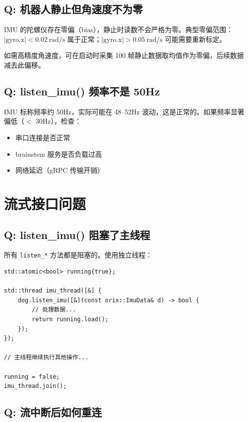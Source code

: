 \documentclass[a4paper,11pt,openany]{book}
\begin{document}
\subsection{Q: 机器人静止但角速度不为零}

IMU 的陀螺仪存在零偏（bias），静止时读数不会严格为零。典型零偏范围：
$|\text{gyro.x}| < 0.02\ \text{rad/s}$ 属于正常；$|\text{gyro.x}| > 0.05\ \text{rad/s}$ 可能需要重新标定。

如需高精度角速度，可在启动时采集 100 帧静止数据取均值作为零偏，后续数据减去此偏移。

\subsection{Q: listen\_imu() 频率不是 50Hz}

IMU 标称频率约 50Hz，实际可能在 48--52Hz 波动，这是正常的。如果频率显著偏低（$<$ 30Hz），检查：

\begin{itemize}[nosep]
  \item 串口连接是否正常
  \item brainstem 服务是否负载过高
  \item 网络延迟（gRPC 传输开销）
\end{itemize}

\section{流式接口问题}

\subsection{Q: listen\_imu() 阻塞了主线程}

所有 \texttt{listen\_*} 方法都是阻塞的。使用独立线程：

\begin{lstlisting}[style=cpp]
std::atomic<bool> running{true};

std::thread imu_thread([&] {
    dog.listen_imu([&](const orix::ImuData& d) -> bool {
        // 处理数据...
        return running.load();
    });
});

// 主线程继续执行其他操作...

running = false;
imu_thread.join();
\end{lstlisting}

\subsection{Q: 流中断后如何重连}
\end{document}

